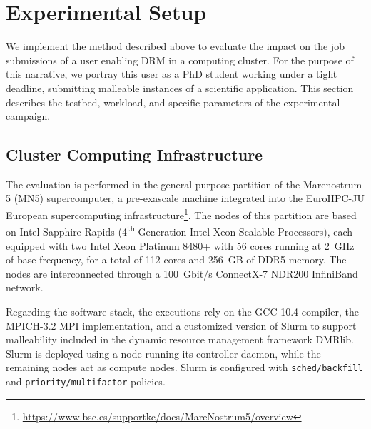 \documentclass[a4paper,fleqn]{cas-dc}
\newcommand{\sergio}[1]{\textcolor{black}{#1}}
\begin{document}

\section{Experimental Setup}\label{sec:experiments}
We implement the method described above to evaluate the impact on the job submissions of a user enabling DRM in a computing cluster.
For the purpose of this narrative, we portray this user as a PhD student working under a tight deadline, submitting malleable instances of a scientific application.
This section describes the testbed, workload, and specific parameters of the experimental campaign.

\subsection{Cluster Computing Infrastructure}
\label{subsec:testbed}
The evaluation is performed in the general-purpose partition of the Marenostrum 5 (MN5) supercomputer, a pre-exascale machine integrated into the EuroHPC-JU European supercomputing infrastructure\footnote{\url{https://www.bsc.es/supportkc/docs/MareNostrum5/overview}}.
The nodes of this partition are based on Intel Sapphire Rapids (4\textsuperscript{th} Generation Intel Xeon Scalable Processors), each equipped with two Intel Xeon Platinum 8480+ with 56 cores running at 2~GHz of base frequency, for a total of 112 cores and 256~GB of DDR5 memory.
The nodes are interconnected through a 100~Gbit/s ConnectX-7 NDR200 InfiniBand network.

Regarding the software stack, the executions rely on the GCC-10.4 compiler, the MPICH-3.2 MPI implementation, and a customized version of Slurm to support malleability included in the dynamic resource management framework DMRlib. 
Slurm is deployed using a node running its controller daemon, while the remaining nodes act as compute nodes. 
Slurm is configured with \texttt{sched/backfill} and \texttt{priority/multifactor} policies.
\end{document}

